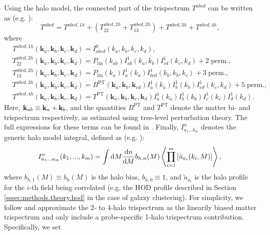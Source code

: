 \documentclass[a4paper,11pt]{article}
\begin{document}
    Using the halo model, the connected part of the trispectrum $T^{abcd}$ can be written as (e.g. \cite{Takada:2013}):
    \begin{equation}
      T^{abcd} = T^{abcd, 1h} + (T^{abcd, 2h}_{22} + T^{abcd, 2h}_{13}) + T^{abcd, 3h} + T^{abcd, 4h},
    \end{equation}
    where
    \begin{align}
      &T^{abcd, 1h}(\mathbf{k}_{a}, \mathbf{k}_{b}, \mathbf{k}_{c}, \mathbf{k}_{d}) = I^{0}_{abcd}(k_{a}, k_{b}, k_{c}, k_{d}), \\
      &T^{abcd, 2h}_{22}(\mathbf{k}_{a}, \mathbf{k}_{b}, \mathbf{k}_{c}, \mathbf{k}_{d}) = P_{\mathrm{lin}}(k_{ab})I^{1}_{ab}(k_{a}, k_{b})I^{1}_{cd}(k_{c}, k_{d}) + 2 \; \mathrm{perm.}, \\
      &T^{abcd, 2h}_{13}(\mathbf{k}_{a}, \mathbf{k}_{b}, \mathbf{k}_{c}, \mathbf{k}_{d}) = P_{\mathrm{lin}}(k_{a})I^{1}_{a}(k_{a})I^{1}_{bcd}(k_{b}, k_{b}, k_{c}) + 3 \; \mathrm{perm.}, \\
      &T^{abcd, 3h}(\mathbf{k}_{a}, \mathbf{k}_{b}, \mathbf{k}_{c}, \mathbf{k}_{d}) = B^{\mathrm{PT}}(\mathbf{k}_{a}, \mathbf{k}_{b}, \mathbf{k}_{cd})I^{1}_{a}(k_{a})I^{1}_{b}(k_{b})I^{1}_{cd}(k_{c}, k_{d}) + 5 \; \mathrm{perm.},\\
      &T^{abcd, 4h}(\mathbf{k}_{a}, \mathbf{k}_{b}, \mathbf{k}_{c}, \mathbf{k}_{d}) = T^{\mathrm{PT}}(\mathbf{k}_{a}, \mathbf{k}_{b}, \mathbf{k}_{c}, \mathbf{k}_{d})I^{1}_{a}(k_{a})I^{1}_{b}(k_{b})I^{1}_{c}(k_{c})I^{1}_{d}(k_{d}).
    \label{eq:halo-mod-trisp}
    \end{align}
    Here, ${\bf k}_{ab}\equiv {\bf k}_a+{\bf k}_b$, and the quantities $B^{\mathrm{PT}}$ and $T^{\mathrm{PT}}$ denote the matter bi- and trispectrum respectively, as estimated using tree-level perturbation theory. The full expressions for these terms can be found in \cite{Takada:2013}. Finally, $I^{n}_{a_1...b_m}$ denotes the generic halo model integral, defined as (e.g. \cite{Krause:2017}):
    \begin{equation}
      I^{n}_{a_1...a_m}(k_1,...,k_m) = \int \mathrm{d}M \frac{\mathrm{d}n}{\mathrm{d}M}b_{h, n}(M)  \left\langle\prod_{i=1}^m \left[\tilde{u}_{a_i}(k_i, M) \right]\right\rangle, \\
    \end{equation}
    where $b_{h,1}(M)\equiv b_h(M)$ is the halo bias, $b_{h,0}\equiv1$, and $\tilde{u}_{a_i}$ is the halo profile for the $i$-th field being correlated (e.g. the HOD profile described in Section \ref{sssec:methods.theory.hod} in the case of galaxy clustering). For simplicity, we follow \cite{Krause:2017} and approximate the 2- to 4-halo trispectrum as the linearily biased matter trispectrum and only include a probe-specific 1-halo trispectrum contribution. Specifically, we set 
\end{document}
